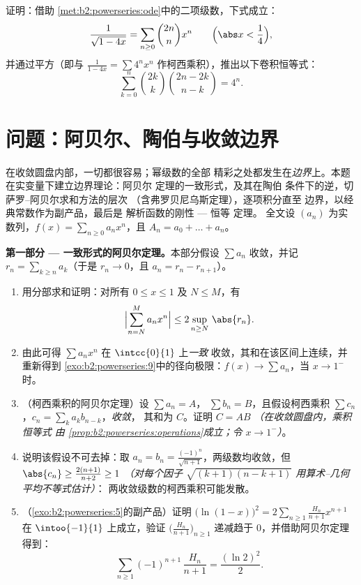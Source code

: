 \begin{exercise}[$\star\star\star$]\label{exo:b2:powerseries:12}
证明：借助
\cref{met:b2:powerseries:ode}中的二项级数，下式成立：
\[
\frac{1}{\sqrt{1 - 4x}} = \sum_{n\geq0}\binom{2n}{n}x^n
\qquad \Bigl(\abs x < \frac14\Bigr),
\]
并通过平方（即与
$\frac{1}{1-4x} = \sum 4^nx^n$ 作柯西乘积），推出以下卷积恒等式：
\[
\sum_{k=0}^{n}\binom{2k}{k}\binom{2n-2k}{n-k} = 4^n .
\]
\end{exercise}

\section{问题：阿贝尔、陶伯与收敛边界}

\begin{problem}\label{pb:b2:powerseries:1}
在收敛圆盘内部，一切都很容易；幂级数的全部
精彩之处都发生在\emph{边界}上。本题
在实变量下建立边界理论：阿贝尔
定理的一致形式，及其在陶伯
条件下的逆，切萨罗--阿贝尔求和方法的层次
（含弗罗贝尼乌斯定理），逐项积分直至
边界，以经典常数作为副产品，最后是
解析函数的刚性 --- 恒等
定理。
全文设 $(a_n)$ 为实数列，$f(x) = \sum_{n\geq0}
a_nx^n$，且 $A_n = a_0 + \dots + a_n$。

\medskip
\noindent\textbf{第一部分 --- 一致形式的阿贝尔定理。}本部分假设
$\sum a_n$ 收敛，并记 $r_n =
\sum_{k\geq n} a_k$（于是 $r_n \to 0$，且 $a_n = r_n -
r_{n+1}$）。
\begin{enumerate}
  \item 用分部求和证明：对所有 $0 \leq x
        \leq 1$ 及 $N \leq M$，有
        \[
        \Bigl|\sum_{n=N}^{M} a_n x^n\Bigr|
        \leq 2\sup_{n \geq N}\,\abs{r_n} .
        \]
  \item 由此可得 $\sum a_nx^n$ 在 $\intcc{0}{1}$ 上\emph{一致}
        收敛，其和在该区间上连续，并
        重新得到
        \cref{exo:b2:powerseries:9}中的径向极限：$f(x) \to \sum a_n$，当 $x
        \to 1^-$ 时。
  \item （柯西乘积的阿贝尔定理）设 $\sum a_n = A$，
        $\sum b_n = B$，且假设柯西乘积 $\sum
        c_n$，$c_n = \sum_{k} a_kb_{n-k}$，\emph{收敛}，
        其和为 $C$。证明 $C = AB$ \emph{（在收敛圆盘内，乘积恒等式
        由
        \cref{prop:b2:powerseries:operations}成立；令 $x \to
        1^-$）}。
  \item 说明该假设不可去掉：取 $a_n = b_n =
        \frac{(-1)^n}{\sqrt{n+1}}$，两级数均收敛，但
        $\abs{c_n} \geq \frac{2(n+1)}{n+2} \geq 1$ \emph{（对每个因子
        $\sqrt{(k+1)(n-k+1)}$ 用算术--几何平均不等式估计）}：
        两收敛级数的柯西乘积可能发散。
  \item （\cref{exo:b2:powerseries:5}的副产品）证明
        $\bigl(\ln(1-x)\bigr)^2 = 2\sum_{n\geq1}
        \frac{H_n}{n+1}x^{n+1}$ 在 $\intoo{-1}{1}$ 上成立，验证
        $\bigl(\frac{H_n}{n+1}\bigr)_{n\geq1}$ 递减趋于
        $0$，并借助阿贝尔定理得到：
        \[
        \sum_{n\geq1} (-1)^{n+1}\,\frac{H_n}{n+1}
        = \frac{(\ln 2)^2}{2} .
        \]
\end{enumerate}


\end{problem}
